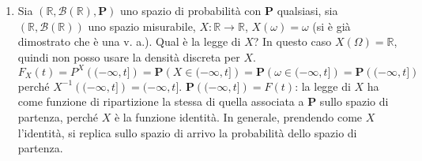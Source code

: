 \documentclass{article}
\begin{document}
\begin{enumerate}
\item Sia $\left( 
\mathbb{R}
,\mathcal{B}\left( 
\mathbb{R}
\right) ,\mathbf{P}\right) $ uno spazio di probabilit\`{a} con $\mathbf{P}$
qualsiasi, sia $\left( 
\mathbb{R}
,\mathcal{B}\left( 
\mathbb{R}
\right) \right) $ uno spazio misurabile, $X:%
\mathbb{R}
\rightarrow 
\mathbb{R}
$, $X\left( \omega \right) =\omega $ (si \`{e} gi\`{a} dimostrato che \`{e}
una v. a.). Qual \`{e} la legge di $X$? In questo caso $X\left( \Omega
\right) =%
\mathbb{R}
$, quindi non posso usare la densit\`{a} discreta per $X$. $F_{X}\left(
t\right) =P^{X}\left( (-\infty ,t]\right) =\mathbf{P}\left( X\in (-\infty
,t]\right) =\mathbf{P}\left( \omega \in (-\infty ,t]\right) =\mathbf{P}%
\left( (-\infty ,t]\right) $ perch\'{e} $X^{-1}\left( (-\infty ,t]\right)
=(-\infty ,t]$. $\mathbf{P}\left( (-\infty ,t]\right) =F\left( t\right) $:
la legge di $X$ ha come funzione di ripartizione la stessa di quella
associata a $\mathbf{P}$ sullo spazio di partenza, perch\'{e} $X$ \`{e} la
funzione identit\`{a}. In generale, prendendo come $X$ l'identit\`{a}, si
replica sullo spazio di arrivo la probabilit\`{a} dello spazio di partenza.


\end{enumerate}
\end{document}
